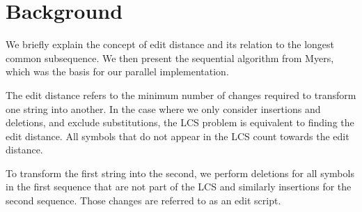 \section{Background}\label{sec:background}
We briefly explain the concept of edit distance and its relation to the longest common subsequence. We then present the sequential algorithm from Myers, which was the basis for our parallel implementation.




The edit distance refers to the minimum number of changes required to transform one string into another. In the case where we only consider insertions and deletions, and exclude substitutions, the LCS problem is equivalent to finding the edit distance. All symbols that do not appear in the LCS count towards the edit distance.

To transform the first string into the second, we perform deletions for all symbols in the first sequence that are not part of the LCS and similarly insertions for the second sequence. Those changes are referred to as an edit script. %


